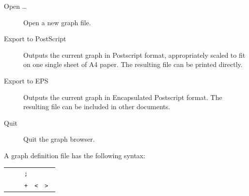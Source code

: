 \begin{isabellebody}
\begin{isamarkuptext}
  \begin{description}
  
  \item[Open \dots] Open a new graph file.
  
  \item[Export to PostScript] Outputs the current graph in Postscript
  format, appropriately scaled to fit on one single sheet of A4 paper.
  The resulting file can be printed directly.
  
  \item[Export to EPS] Outputs the current graph in Encapsulated
  Postscript format. The resulting file can be included in other
  documents.

  \item[Quit] Quit the graph browser.

  \end{description}%
\end{isamarkuptext}%
\isamarkuptrue%
%
\isamarkuptrue%
%
\begin{isamarkuptext}%
A graph definition file has the following syntax:

  \begin{center}\small
  \begin{tabular}{rcl}
    \isa{graph} & \isa{{\isaliteral{22}{\isachardoublequote}}{\isaliteral{3D}{\isacharequal}}{\isaliteral{22}{\isachardoublequote}}} & \isa{{\isaliteral{22}{\isachardoublequote}}{\isaliteral{7B}{\isacharbraceleft}}\ vertex{\isaliteral{22}{\isachardoublequote}}}~\verb|;|~\isa{{\isaliteral{22}{\isachardoublequote}}{\isaliteral{7D}{\isacharbraceright}}{\isaliteral{2B}{\isacharplus}}{\isaliteral{22}{\isachardoublequote}}} \\
    \isa{vertex} & \isa{{\isaliteral{22}{\isachardoublequote}}{\isaliteral{3D}{\isacharequal}}{\isaliteral{22}{\isachardoublequote}}} & \isa{{\isaliteral{22}{\isachardoublequote}}vertex{\isaliteral{5F}{\isacharunderscore}}name\ vertex{\isaliteral{5F}{\isacharunderscore}}ID\ dir{\isaliteral{5F}{\isacharunderscore}}name\ {\isaliteral{5B}{\isacharbrackleft}}{\isaliteral{22}{\isachardoublequote}}}~\verb|+|~\isa{{\isaliteral{22}{\isachardoublequote}}{\isaliteral{5D}{\isacharbrackright}}\ path\ {\isaliteral{5B}{\isacharbrackleft}}{\isaliteral{22}{\isachardoublequote}}}~\verb|<|~\isa{{\isaliteral{22}{\isachardoublequote}}{\isaliteral{7C}{\isacharbar}}{\isaliteral{22}{\isachardoublequote}}}~\verb|>|~\isa{{\isaliteral{22}{\isachardoublequote}}{\isaliteral{5D}{\isacharbrackright}}\ {\isaliteral{7B}{\isacharbraceleft}}\ vertex{\isaliteral{5F}{\isacharunderscore}}ID\ {\isaliteral{7D}{\isacharbraceright}}{\isaliteral{2A}{\isacharasterisk}}{\isaliteral{22}{\isachardoublequote}}}
  \end{tabular}
  \end{center}


\end{isamarkuptext}
\end{isabellebody}
